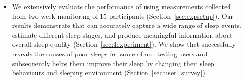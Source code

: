 \begin{itemize}[noitemsep]
	

    \item We extensively evaluate the performance of \systemname using measurements collected from two-week monitoring of $15$
        participants (Section~\ref{sec:expsetup}). Our results demonstrate that \systemname can accurately capture a wide range of sleep
        events, estimate different sleep stages, and produce meaningful information about overall sleep quality
        (Section~\ref{sec:4experiment}).  We show that \systemname successfully reveals the causes of poor sleeps for some of our testing
        users and subsequently helps them improve their sleep by changing their sleep behaviours and sleeping environment
        (Section~\ref{sec:user_survey}).
\end{itemize}

